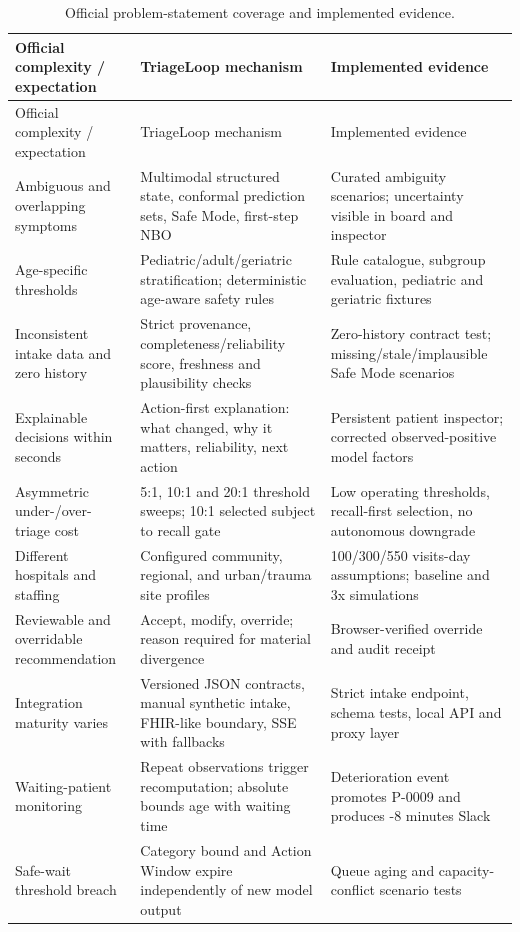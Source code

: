 \documentclass[11pt,a4paper]{article}
\begin{document}
\begin{longtable}{@{}L{37mm}L{54mm}L{65mm}@{}}
\caption{Official problem-statement coverage and implemented evidence.}\label{tab:pscoverage}\\
\toprule
Official complexity / expectation & TriageLoop mechanism & Implemented evidence \\
\midrule
\endfirsthead
\toprule
Official complexity / expectation & TriageLoop mechanism & Implemented evidence \\
\midrule
\endhead
Ambiguous and overlapping symptoms & Multimodal structured state, conformal prediction sets, Safe Mode, first-step NBO & Curated ambiguity scenarios; uncertainty visible in board and inspector \\
Age-specific thresholds & Pediatric/adult/geriatric stratification; deterministic age-aware safety rules & Rule catalogue, subgroup evaluation, pediatric and geriatric fixtures \\
Inconsistent intake data and zero history & Strict provenance, completeness/reliability score, freshness and plausibility checks & Zero-history contract test; missing/stale/implausible Safe Mode scenarios \\
Explainable decisions within seconds & Action-first explanation: what changed, why it matters, reliability, next action & Persistent patient inspector; corrected observed-positive model factors \\
Asymmetric under-/over-triage cost & 5:1, 10:1 and 20:1 threshold sweeps; 10:1 selected subject to recall gate & Low operating thresholds, recall-first selection, no autonomous downgrade \\
Different hospitals and staffing & Configured community, regional, and urban/trauma site profiles & 100/300/550 visits-day assumptions; baseline and 3x simulations \\
Reviewable and overridable recommendation & Accept, modify, override; reason required for material divergence & Browser-verified override and audit receipt \\
Integration maturity varies & Versioned JSON contracts, manual synthetic intake, FHIR-like boundary, SSE with fallbacks & Strict intake endpoint, schema tests, local API and proxy layer \\
Waiting-patient monitoring & Repeat observations trigger recomputation; absolute bounds age with waiting time & Deterioration event promotes P-0009 and produces -8 minutes Slack \\
Safe-wait threshold breach & Category bound and Action Window expire independently of new model output & Queue aging and capacity-conflict scenario tests \\

\end{longtable}
\end{document}
